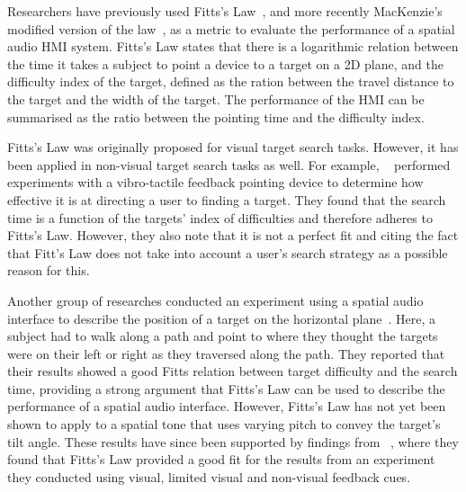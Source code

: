 \documentclass[format=sigconf, review=true, screen=true, anonymous=true]{acmart}
\begin{document}
Researchers have previously used Fitts's Law~\cite{fitts1954information}, and more recently MacKenzie's modified version of the law~\cite{mackenzie1992fitts}, as a metric to evaluate the performance of a spatial audio HMI system. Fitts's Law states that there is a logarithmic relation between the time it takes a subject to point a device to a target on a 2D plane, and the difficulty index of the target, defined as the ration between the travel distance to the target and the width of the target. The performance of the HMI can be summarised as the ratio between the pointing time and the difficulty index. 


Fitts's Law was originally proposed for visual target search tasks. However, it has been applied in non-visual target search tasks as well. For example, \citeauthor{ahmaniemi2009augmented}~\cite{ahmaniemi2009augmented} performed experiments with a vibro-tactile feedback pointing device to determine how effective it is at directing a user to finding a target. They found that the search time is a function of the targets' index of difficulties and therefore adheres to Fitts's Law. However, they also note that it is not a perfect fit and citing the fact that Fitt's Law does not take into account a user's search strategy as a possible reason for this. 

Another group of researches conducted an experiment using a spatial audio interface to describe the position of a target on the horizontal plane~\cite{marentakis2006effects}. Here, a subject had to walk along a path and point to where they thought the targets were on their left or right as they traversed along the path. They reported that their results showed a good Fitts relation between target difficulty and the search time, providing a strong argument that Fitts's Law can be used to describe the performance of a spatial audio interface. However, Fitts's Law has not yet been shown to apply to a spatial tone that uses varying pitch to convey the target's tilt angle. These results have since been supported by findings from \citeauthor{wu2010fitts}~\cite{wu2010fitts}, where they found that Fitts's Law provided a good fit for the results from an experiment they conducted using visual, limited visual and non-visual feedback cues. 
\end{document}
